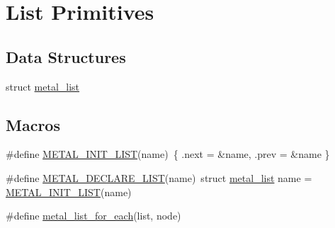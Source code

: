 \hypertarget{group__list}{}\section{List Primitives}
\label{group__list}
\subsection*{Data Structures}
\begin{DoxyCompactItemize}
\item 
struct \hyperlink{structmetal__list}{metal\+\_\+list}
\end{DoxyCompactItemize}
\subsection*{Macros}
\begin{DoxyCompactItemize}
\item 
\#define \hyperlink{group__list_gaedf029e92ec601dc333a2a67754c0a68}{M\+E\+T\+A\+L\+\_\+\+I\+N\+I\+T\+\_\+\+L\+I\+ST}(name)~\{ .next = \&name, .prev = \&name \}
\item 
\#define \hyperlink{group__list_ga57d0ab3678bb47929984aeb5201a7c3d}{M\+E\+T\+A\+L\+\_\+\+D\+E\+C\+L\+A\+R\+E\+\_\+\+L\+I\+ST}(name)~struct \hyperlink{structmetal__list}{metal\+\_\+list} name = \hyperlink{group__list_gaedf029e92ec601dc333a2a67754c0a68}{M\+E\+T\+A\+L\+\_\+\+I\+N\+I\+T\+\_\+\+L\+I\+ST}(name)
\item 
\#define \hyperlink{group__list_ga84a435a63bab936c3d3f82611e4d9723}{metal\+\_\+list\+\_\+for\+\_\+each}(list,  node)
\end{DoxyCompactItemize}
